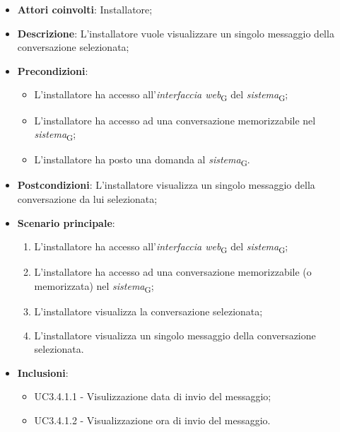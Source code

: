 \begin{itemize}
    \item \textbf{Attori coinvolti}: Installatore;
    \item \textbf{Descrizione}: L'installatore vuole visualizzare un singolo messaggio della conversazione selezionata;
    \item \textbf{Precondizioni}: 
    \begin{itemize}
        \item L’installatore ha accesso all’\textit{interfaccia web}\textsubscript{G} del \textit{sistema}\textsubscript{G};
        \item L’installatore ha accesso ad una conversazione memorizzabile nel \textit{sistema}\textsubscript{G};
        \item L'installatore ha posto una domanda al \textit{sistema}\textsubscript{G}.
    \end{itemize}
    \item \textbf{Postcondizioni}: L'installatore visualizza un singolo messaggio della conversazione da lui selezionata;
    \item \textbf{Scenario principale}:
    \begin{enumerate}
        \item L’installatore ha accesso all’\textit{interfaccia web}\textsubscript{G} del \textit{sistema}\textsubscript{G};
        \item L’installatore ha accesso ad una conversazione memorizzabile (o memorizzata) nel \textit{sistema}\textsubscript{G};
        \item L'installatore visualizza la conversazione selezionata;
        \item L'installatore visualizza un singolo messaggio della conversazione selezionata.
    \end{enumerate}
    \item \textbf{Inclusioni}: 
    \begin{itemize}
        \item UC3.4.1.1 - Visulizzazione data di invio del messaggio;
        \item UC3.4.1.2 - Visualizzazione ora di invio del messaggio.
    \end{itemize}
\end{itemize}

